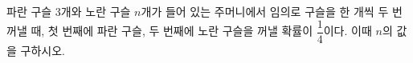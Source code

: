 파란 구슬 3개와 노란 구슬 $n$개가 들어 있는 주머니에서 임의로 구슬을 한 개씩 두 번 꺼낼 때, 첫 번째에 파란 구슬, 두 번째에 노란 구슬을 꺼낼 확률이 $\dfrac{1}{4}$이다. 이때 $n$의 값을 구하시오. 
